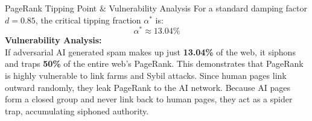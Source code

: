 \documentclass[11pt,a4paper]{article}
\begin{document}
\begin{resultbox}{PageRank Tipping Point \& Vulnerability Analysis}
For a standard damping factor $d = 0.85$, the critical tipping fraction $\alpha^*$ is:
\[ \alpha^* \approx \mathbf{13.04\%} \]
\textbf{Vulnerability Analysis:} \\
If adversarial AI generated spam makes up just \textbf{13.04\%} of the web, it siphons and traps \textbf{50\%} of the entire web's PageRank. This demonstrates that PageRank is highly vulnerable to link farms and Sybil attacks. Since human pages link outward randomly, they leak PageRank to the AI network. Because AI pages form a closed group and never link back to human pages, they act as a spider trap, accumulating siphoned authority.
\end{resultbox}
\end{document}
